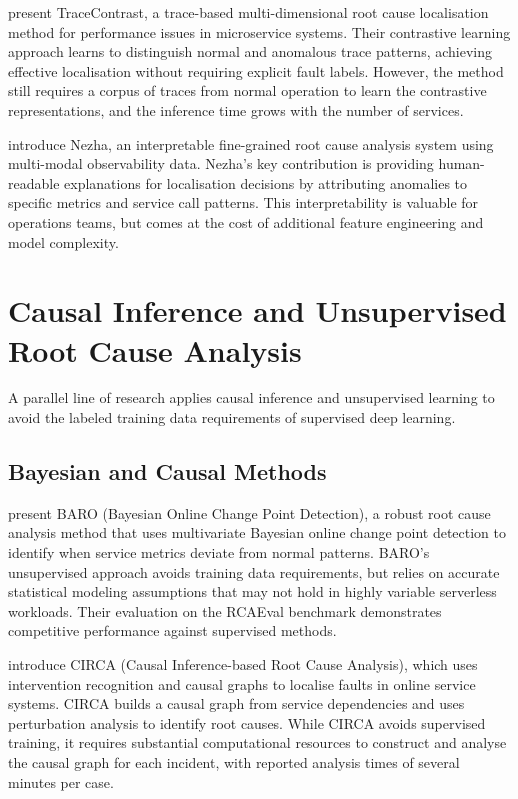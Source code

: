 \citet{zhang2024tracecontrast} present TraceContrast, a trace-based multi-dimensional root cause localisation method for performance issues in microservice systems. Their contrastive learning approach learns to distinguish normal and anomalous trace patterns, achieving effective localisation without requiring explicit fault labels. However, the method still requires a corpus of traces from normal operation to learn the contrastive representations, and the inference time grows with the number of services.

\citet{yu2023nezha} introduce Nezha, an interpretable fine-grained root cause analysis system using multi-modal observability data. Nezha's key contribution is providing human-readable explanations for localisation decisions by attributing anomalies to specific metrics and service call patterns. This interpretability is valuable for operations teams, but comes at the cost of additional feature engineering and model complexity.

\section{Causal Inference and Unsupervised Root Cause Analysis}

A parallel line of research applies causal inference and unsupervised learning to avoid the labeled training data requirements of supervised deep learning.

\subsection{Bayesian and Causal Methods}

\citet{pham2024baro} present BARO (Bayesian Online Change Point Detection), a robust root cause analysis method that uses multivariate Bayesian online change point detection to identify when service metrics deviate from normal patterns. BARO's unsupervised approach avoids training data requirements, but relies on accurate statistical modeling assumptions that may not hold in highly variable serverless workloads. Their evaluation on the RCAEval benchmark demonstrates competitive performance against supervised methods.

\citet{li2022circa} introduce CIRCA (Causal Inference-based Root Cause Analysis), which uses intervention recognition and causal graphs to localise faults in online service systems. CIRCA builds a causal graph from service dependencies and uses perturbation analysis to identify root causes. While CIRCA avoids supervised training, it requires substantial computational resources to construct and analyse the causal graph for each incident, with reported analysis times of several minutes per case.

